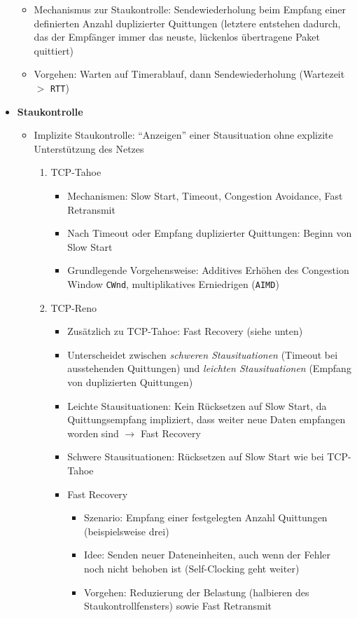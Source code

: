 \begin{itemize}
\begin{itemize}
		\item Mechanismus zur Staukontrolle: Sendewiederholung beim Empfang einer definierten Anzahl duplizierter Quittungen (letztere entstehen dadurch, das der Empfänger immer das neuste, lückenlos übertragene Paket quittiert)
		\item Vorgehen: Warten auf Timerablauf, dann Sendewiederholung (Wartezeit \(>\) \texttt{RTT})
	\end{itemize}
	\item \textbf{Staukontrolle}
	\begin{itemize}
		\item Implizite Staukontrolle: "`Anzeigen"' einer Stausituation ohne explizite Unterstützung des Netzes
		\begin{enumerate}
			\item TCP-Tahoe
			\begin{itemize}
				\item Mechanismen: Slow Start, Timeout, Congestion Avoidance, Fast Retransmit
				\item Nach Timeout oder Empfang duplizierter Quittungen: Beginn von Slow Start
				\item Grundlegende Vorgehensweise: Additives Erhöhen des Congestion Window \texttt{CWnd}, multiplikatives Erniedrigen (\texttt{AIMD})
			\end{itemize}
			\item TCP-Reno
			\begin{itemize}
				\item Zusätzlich zu TCP-Tahoe: Fast Recovery (siehe unten)
				\item Unterscheidet zwischen \textit{schweren Stausituationen} (Timeout bei ausstehenden Quittungen) und \textit{leichten Stausituationen} (Empfang von duplizierten Quittungen)
				\item Leichte Stausituationen: Kein Rücksetzen auf Slow Start, da Quittungsempfang impliziert, dass weiter neue Daten empfangen worden sind \(\rightarrow\) Fast Recovery
				\item Schwere Stausituationen: Rücksetzen auf Slow Start wie bei TCP-Tahoe
				\item Fast Recovery
				\begin{itemize}
					\item Szenario: Empfang einer festgelegten Anzahl Quittungen (beispielsweise drei)
					\item Idee: Senden neuer Dateneinheiten, auch wenn der Fehler noch nicht behoben ist (Self-Clocking geht weiter)
					\item Vorgehen: Reduzierung der Belastung (halbieren des Staukontrollfensters) sowie Fast Retransmit

\end{itemize}
\end{itemize}
\end{enumerate}
\end{itemize}
\end{itemize}

